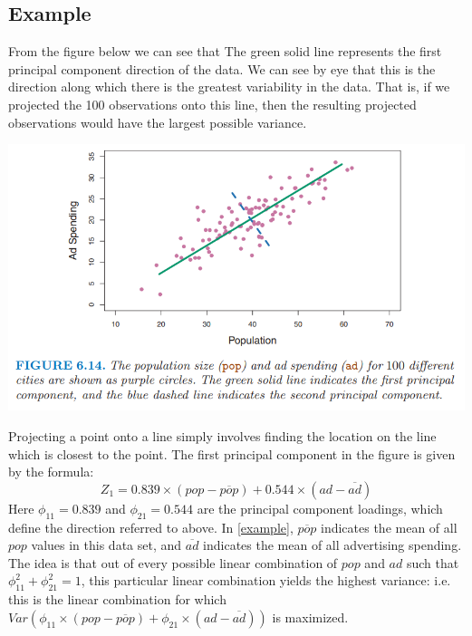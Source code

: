 \subsection{Example}
From the figure below we can see that The green solid line represents the first principal component direction of the data. We can see by eye that this is the direction along which there is the greatest variability in the data. That is, if we projected the 100 observations onto this line, then the resulting projected observations would have the largest possible variance.
\begin{center}
    \includegraphics[scale=0.8]{images/first princ comp.png}
\end{center}
Projecting a point onto a line simply involves finding the location on the line which is closest to the point. The first principal component in the figure is given by the formula:
\begin{equation}
    Z_1 = 0.839 \times (pop - \overline{pop}) + 0.544 \times (ad - \overline{ad})
    \label{example}
\end{equation}
Here $\phi_{11} = 0.839$ and $\phi_{21} = 0.544$ are the principal component loadings, which define the direction referred to above. In \ref{example}, $\overline{pop}$ indicates the mean of all $pop$ values in this data set, and $\overline{ad}$ indicates the mean of all advertising spending. The idea is that out of every possible linear combination of $pop$ and $ad$ such that $\phi_{11}^2 + \phi_{21}^2 = 1$, this particular linear combination
yields the highest variance: i.e. this is the linear combination for which $Var(\phi_{11} \times (pop - \overline{pop}) + \phi_{21} \times (ad - \overline{ad}))$ is maximized.

